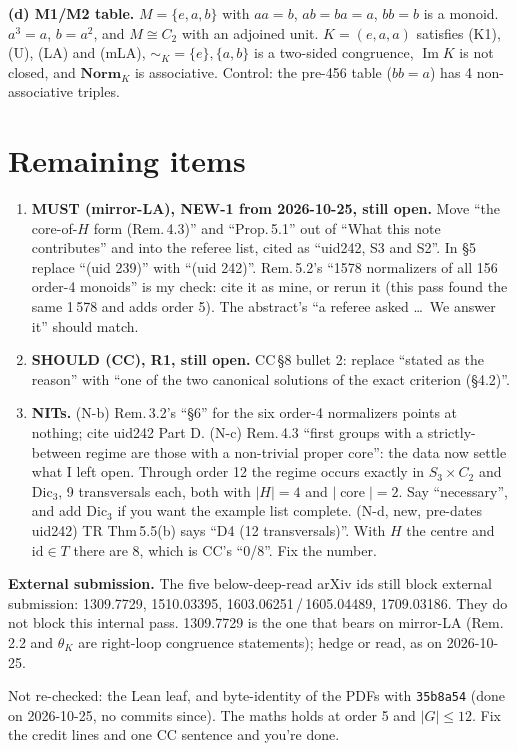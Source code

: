 \documentclass[11pt]{article}
\newcommand{\Norm}{\mathbf{Norm}}
\renewcommand{\Im}{\operatorname{Im}}
\newcommand{\core}{\operatorname{core}}
\begin{document}
\textbf{(d) M1/M2 table.} $M=\{e,a,b\}$ with $a a=b$, $ab=ba=a$, $bb=b$ is a monoid. $a^3=a$, $b=a^2$, and $M\cong C_2$ with an adjoined unit.
$K=(e,a,a)$ satisfies (K1), (U), (LA) and (mLA), ${\sim_K}=\{e\},\{a,b\}$ is a two-sided congruence, $\Im K$ is not closed, and $\Norm_K$ is associative.
Control: the pre-456 table ($bb=a$) has 4 non-associative triples.

\section*{Remaining items}
\begin{enumerate}[label=\textbf{\arabic*.},leftmargin=*]
\item \textbf{MUST (mirror-LA), NEW-1 from 2026-10-25, still open.} Move ``the core-of-$H$ form (Rem.\,4.3)'' and ``Prop.\,5.1''
  out of ``What this note contributes'' and into the referee list, cited as ``uid242, S3 and S2''. In \S5 replace ``(uid 239)'' with ``(uid 242)''.
  Rem.\,5.2's ``1578 normalizers of all 156 order-4 monoids'' is my check: cite it as mine, or rerun it (this pass found the same 1\,578 and adds order 5).
  The abstract's ``a referee asked \dots\ We answer it'' should match.
\item \textbf{SHOULD (CC), R1, still open.} CC\,\S8 bullet 2: replace ``stated as the reason'' with ``one of the two canonical solutions of the exact criterion (\S4.2)''.
\item \textbf{NITs.} (N-b) Rem.\,3.2's ``\S6'' for the six order-4 normalizers points at nothing; cite uid242 Part D.
  (N-c) Rem.\,4.3 ``first groups with a strictly-between regime are those with a non-trivial proper core'': the data now settle what I left open.
  Through order 12 the regime occurs exactly in $S_3{\times}C_2$ and $\mathrm{Dic}_3$, 9 transversals each, both with $|H|=4$ and $|\core|=2$.
  Say ``necessary'', and add $\mathrm{Dic}_3$ if you want the example list complete.
  (N-d, new, pre-dates uid242) TR Thm\,5.5(b) says ``D4 (12 transversals)''. With $H$ the centre and $\mathrm{id}\in T$ there are 8, which is CC's ``0/8''. Fix the number.
\end{enumerate}

\textbf{External submission.} The five below-deep-read arXiv ids still block external submission: 1309.7729, 1510.03395, 1603.06251\,/\,1605.04489, 1709.03186. They do not block this internal pass. 1309.7729 is the one that bears on mirror-LA (Rem.\,2.2 and $\theta_K$ are right-loop
congruence statements); hedge or read, as on 2026-10-25.

Not re-checked: the Lean leaf, and byte-identity of the PDFs with \texttt{35b8a54} (done on 2026-10-25, no commits since).
The maths holds at order 5 and $|G|\le12$. Fix the credit lines and one CC sentence and you're done.
\end{document}
